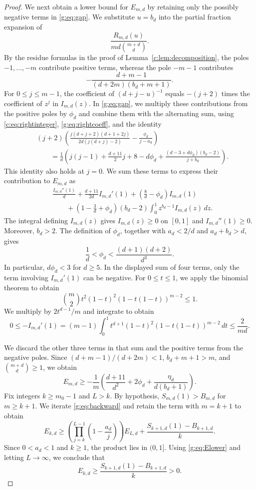 \documentclass[10pt,a4paper]{article}
\numberwithin{equation}{section}
\theoremstyle{remark}\newtheorem{remark}[theorem]{Remark}
\begin{document}
\begin{proof}
We next obtain a lower bound for $E_{m,d}$ by retaining only
the possibly negative terms in \eqref{g:eq:gap}.
We substitute $u=b_d$ into the partial fraction expansion of
\[
 \frac{R_{m,d}(u)}{md\binom{m+d}{d}}.
\]
By the residue formulas in the proof of
Lemma~\ref{c:lem:decomposition}, the poles $-1,\ldots,-m$ contribute
positive terms, whereas the pole $-m-1$ contributes
\[
 -\frac{d+m-1}{(d+2m)(b_d+m+1)}.
\]
For $0\le j\le m-1$, the coefficient of $(d+j-u)^{-1}$ equals
$-(j+2)$ times the coefficient of $z^j$ in $I_{m,d}(z)$.
In \eqref{g:eq:gap}, we multiply these contributions from the positive poles by
$\phi_d$ and combine them with the alternating sum, using \eqref{c:eq:rightinteger},
\eqref{g:eq:rightcoeff}, and the identity
\[
\begin{aligned}
 &(j+2)\left(
 \frac{j(d+j+2)(d+1+2j)}{2d(j(d+j)-2)}
 -\frac{\phi_d}{j-a_d}\right)\\
 &\qquad=\frac1d\left(j(j-1)+\frac{d+11}{2}j+8-d\phi_d
 +\frac{(d-3+d\phi_d)(b_d-2)}{j+b_d}\right).
\end{aligned}
\]
This identity also holds at $j=0$. We sum these terms to express their
contribution to $E_{m,d}$ as
\[
\begin{aligned}
 &\frac{I_{m,d}''(1)}d+\frac{d+11}{2d}I_{m,d}'(1)
 +\left(\frac8d-\phi_d\right)I_{m,d}(1)\\
 &\qquad+\left(1-\frac3d+\phi_d\right)(b_d-2)
 \int_0^1z^{b_d-1}I_{m,d}(z)\,dz.
\end{aligned}
\]
The integral defining $I_{m,d}(z)$ gives $I_{m,d}(z)\ge0$ on $[0,1]$
and $I_{m,d}''(1)\ge0$. Moreover, $b_d>2$.
The definition of $\phi_d$, together with $a_d<2/d$ and $a_d+b_d>d$, gives
\begin{equation}\label{v3:eq:phibounds}
 \frac1d<\phi_d<\frac{(d+1)(d+2)}{d^3}.
\end{equation}
In particular, $d\phi_d<3$ for $d\ge5$.
In the displayed sum of four terms, only the term involving
$I_{m,d}'(1)$ can be negative.
For $0\le t\le1$, we apply the binomial theorem to obtain
\[
 \binom m2t^2(1-t)^2(1-t(1-t))^{m-2}\le1.
\]
We multiply by $2t^{d-1}/m$ and integrate to obtain
\[
 0\le-I_{m,d}'(1)
 =(m-1)\int_0^1t^{d+1}(1-t)^2(1-t(1-t))^{m-2}\,dt
 \le\frac2{md}.
\]

We discard the other three terms in that sum and the positive terms
from the negative poles.
Since $(d+m-1)/(d+2m)<1$, $b_d+m+1>m$, and $\binom{m+d}{d}\ge1$,
we obtain
\begin{equation}\label{g:eq:Elower}
 E_{m,d}\ge-\frac1m\left(
 \frac{d+11}{d^2}+2\phi_d+\frac{\eta_d}{d(b_d+1)}\right).
\end{equation}
Fix integers $k\ge m_0-1$ and $L>k$. By hypothesis,
$S_{m,d}(1)>B_{m,d}$ for $m\ge k+1$.
We iterate \eqref{g:eq:backward} and retain the term with $m=k+1$ to obtain
\[
 E_{k,d}\ge\left(\prod_{j=k}^{L-1}\left(1-\frac{a_d}{j}\right)\right)E_{L,d}
 +\frac{S_{k+1,d}(1)-B_{k+1,d}}{k}.
\]
Since $0<a_d<1$ and $k\ge1$, the product lies in $(0,1]$.
Using \eqref{g:eq:Elower} and letting $L\to\infty$, we conclude that
\[
 E_{k,d}\ge\frac{S_{k+1,d}(1)-B_{k+1,d}}{k}>0.
\]
\end{proof}
\end{document}
